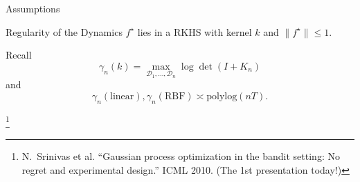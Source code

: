 \documentclass[11pt,aspectratio=169]{beamer}
\newcommand\reffootnote[1]{%
\begingroup
\renewcommand\thefootnote{}\footnote{\hspace{-20px}\color{DarkGray}#1\vspace{5px}}%
\addtocounter{footnote}{-1}%
\endgroup
}
\begin{document}


\begin{frame}{Assumptions}

            

    \begin{block}{Regularity of the Dynamics}
        $f^\star$ lies in a RKHS with kernel $k$ and $\lVert f^\star \rVert \leq 1$.
    \end{block}

    Recall
    \[
        \gamma_n(k) = \max_{\mathcal{D}_1,\ldots,\mathcal{D}_n} \log\det(I + K_n)
    \]
    and
    \[
        \gamma_n(\text{linear}), \gamma_n(\text{RBF}) \asymp \text{polylog}(nT).
    \]

    
    \reffootnote{N.~Srinivas et al. ``Gaussian process optimization in the bandit setting: No regret and experimental design.'' ICML 2010. (The 1st presentation today!)}
\end{frame}
\end{document}
